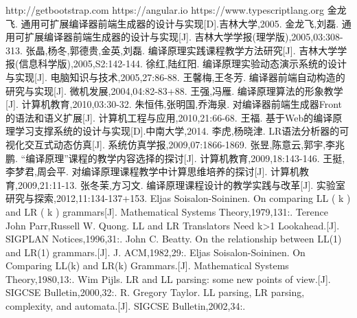 \documentclass[a4paper]{article}
\newcommand{\小二}{\fontsize{18pt}{\baselineskip}\selectfont}
\newcommand{\小三}{\fontsize{15pt}{\baselineskip}\selectfont}
\newcommand{\小四}{\fontsize{12pt}{\baselineskip}\selectfont}
\begin{document}
\begin{spacing}{1.5}
\newpage
{}
\begin{thebibliography}{0}
http://getbootstrap.com
https://angular.io
https://www.typescriptlang.org
金龙飞. 通用可扩展编译器前端生成器的设计与实现[D].吉林大学,2005.
金龙飞,刘磊. 通用可扩展编译器前端生成器的设计与实现[J]. 吉林大学学报(理学版),2005,03:308-313.
张晶,杨冬,郭德贵,金英,刘磊. 编译原理实践课程教学方法研究[J]. 吉林大学学报(信息科学版),2005,S2:142-144.
徐红,陆红阳. 编译原理实验动态演示系统的设计与实现[J]. 电脑知识与技术,2005,27:86-88.
王馨梅,王冬芳. 编译器前端自动构造的研究与实现[J]. 微机发展,2004,04:82-83+88.
王强,冯雁. 编译原理算法的形象教学[J]. 计算机教育,2010,03:30-32.
朱恒伟,张明国,乔海泉. 对编译器前端生成器Front的语法和语义扩展[J]. 计算机工程与应用,2010,21:66-68.
王福. 基于Web的编译原理学习支撑系统的设计与实现[D].中南大学,2014.
李虎,杨晓津. LR语法分析器的可视化交互式动态仿真[J]. 系统仿真学报,2009,07:1866-1869.
张昱,陈意云,郭宇,李兆鹏. “编译原理”课程的教学内容选择的探讨[J]. 计算机教育,2009,18:143-146.
王挺,李梦君,周会平. 对编译原理课程教学中计算思维培养的探讨[J]. 计算机教育,2009,21:11-13.
张冬茉,方习文. 编译原理课程设计的教学实践与改革[J]. 实验室研究与探索,2012,11:134-137+153.
Eljas Soisalon-Soininen. On comparing LL ( k ) and LR ( k ) grammars[J]. Mathematical Systems Theory,1979,131:.
Terence John Parr,Russell W. Quong. LL and LR Translators Need k>1 Lookahead.[J]. SIGPLAN Notices,1996,31:.
John C. Beatty. On the relationship between LL(1) and LR(1) grammars.[J]. J. ACM,1982,29:.
Eljas Soisalon-Soininen. On Comparing LL(k) and LR(k) Grammars.[J]. Mathematical Systems Theory,1980,13:.
Wim Pijls. LR and LL parsing: some new points of view.[J]. SIGCSE Bulletin,2000,32:.
R. Gregory Taylor. LL parsing, LR parsing, complexity, and automata.[J]. SIGCSE Bulletin,2002,34:.
\end{thebibliography}

\appendix
\newpage


\newpage


\end{spacing}
\end{document}
